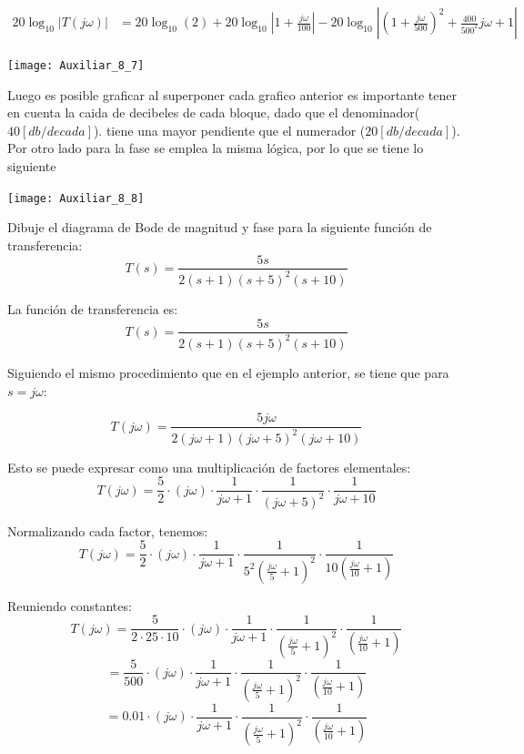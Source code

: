 \documentclass[
  11pt,
  letterpaper,
   addpoints,
   answers
  ]{exam}
\begin{document}
\begin{questions}
\begin{solution}
\begin{align*}
    20 \log_{10} |T(j\omega)| &= 20 \log_{10} (2) + 20 \log_{10} \left| 1 + \frac{j\omega}{100} \right| - 20 \log_{10} \left| \left( 1 + \frac{j\omega}{500} \right)^2 + \frac{400}{500^2} j\omega + 1 \right|
\end{align*}
\begin{center}
    \texttt{[image: Auxiliar\_8\_7]}
\end{center}
Luego es posible graficar al superponer cada grafico anterior es importante tener en cuenta la caida de decibeles de cada bloque, dado que el denominador($40 [db/decada]$). tiene una mayor pendiente que el numerador ($20 [db/decada]$). Por otro lado para la fase se emplea la misma lógica, por lo que se tiene lo siguiente
\begin{center}
    \texttt{[image: Auxiliar\_8\_8]}
\end{center}
\end{solution}
\question Dibuje el diagrama de Bode de magnitud y fase para la siguiente función de transferencia:
\begin{equation}
    T(s) = \frac{5s}{2(s+1)(s+5)^2(s+10)}
\end{equation}
\begin{solution}
 La función de transferencia es:
\begin{equation}
    T(s) = \frac{5s}{2(s+1)(s+5)^2(s+10)}
\end{equation}

Siguiendo el mismo procedimiento que en el ejemplo anterior, se tiene que para \( s = j\omega \):

\[
T(j\omega) = \frac{5j\omega}{2(j\omega+1)(j\omega+5)^2(j\omega+10)}
\]

Esto se puede expresar como una multiplicación de factores elementales:
\[
T(j\omega) = \frac{5}{2} \cdot (j\omega) \cdot \frac{1}{j\omega+1} \cdot \frac{1}{(j\omega+5)^2} \cdot \frac{1}{j\omega+10}
\]

Normalizando cada factor, tenemos:
\[
T(j\omega) = \frac{5}{2} \cdot (j\omega) \cdot \frac{1}{j\omega+1} \cdot \frac{1}{5^2 \left( \frac{j\omega}{5} + 1 \right)^2} \cdot \frac{1}{10 \left( \frac{j\omega}{10} + 1 \right)}
\]

Reuniendo constantes:
\[
T(j\omega) = \frac{5}{2 \cdot 25 \cdot 10} \cdot (j\omega) \cdot \frac{1}{j\omega+1} \cdot \frac{1}{\left( \frac{j\omega}{5} + 1 \right)^2} \cdot \frac{1}{\left( \frac{j\omega}{10} + 1 \right)}
\]
\[
= \frac{5}{500} \cdot (j\omega) \cdot \frac{1}{j\omega+1} \cdot \frac{1}{\left( \frac{j\omega}{5} + 1 \right)^2} \cdot \frac{1}{\left( \frac{j\omega}{10} + 1 \right)}
\]
\[
= 0.01 \cdot (j\omega) \cdot \frac{1}{j\omega+1} \cdot \frac{1}{\left( \frac{j\omega}{5} + 1 \right)^2} \cdot \frac{1}{\left( \frac{j\omega}{10} + 1 \right)}
\]


\end{solution}
\end{questions}
\end{document}
